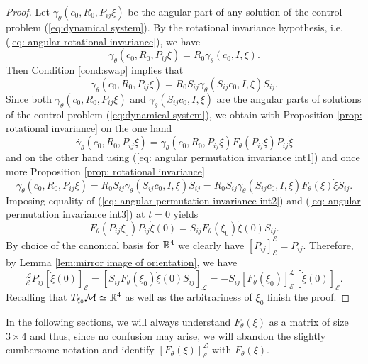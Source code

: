 \begin{proof}
Let $\gamma_\theta(c_0, R_0, P_{ij}\xi)$ be the angular part of any solution of the control problem (\ref{eq:dynamical system}). By the rotational invariance hypothesis, i.e. (\ref{eq: angular rotational invariance}), we have
\begin{equation}
	\gamma_\theta(c_0, R_0, P_{ij}\xi) = R_0 \gamma_\theta(c_0, I, \xi).
\end{equation}
Then Condition \ref{cond:swap} implies that
\begin{equation}
\label{eq: angular permutation invariance int1}
	\gamma_\theta(c_0, R_0,P_{ij} \xi) = R_0 S_{ij} \gamma_\theta(S_{ij}c_0, I, \xi) S_{ij}.
\end{equation}
Since both $\gamma_\theta(c_0, R_0, P_{ij} \xi)$ and $\gamma_\theta(S_{ij} c_0, I, \xi)$ are the angular parts of solutions of the control problem (\ref{eq:dynamical system}), we obtain with Proposition \ref{prop: rotational invariance} on the one hand
\begin{equation}
\label{eq: angular permutation invariance int2}
	\dot{\gamma_\theta}(c_0, R_0, P_{ij} \xi)= \gamma_\theta(c_0, R_0, P_{ij} \xi) F_{\theta}(P_{ij} \xi) P_{ij } \dot{\xi}
\end{equation}
and on the other hand using (\ref{eq: angular permutation invariance int1}) and once more Proposition \ref{prop: rotational invariance}
\begin{equation}
\label{eq: angular permutation invariance int3}
	\dot{\gamma_\theta}(c_0, R_0, P_{ij} \xi) =  R_0 S_{ij} \dot{\gamma_\theta}(S_{ij} c_0, I, \xi) S_{ij} = R_0 S_{ij} \gamma_\theta(S_{ij} c_0, I, \xi) F_{\theta}(\xi) \dot{\xi} S_{ij}.
\end{equation}
Imposing equality of (\ref{eq: angular permutation invariance int2}) and (\ref{eq: angular permutation invariance int3}) at $t = 0$ yields
\begin{equation}
	F_{\theta}(P_{ij} \xi_0) P_{ij}  \dot{\xi}(0) = S_{ij} F_{\theta}(\xi_0) \dot{\xi}(0) S_{ij}.
\end{equation}
By choice of the canonical basis for $\mathbb{R}^4$ we clearly have $[P_{ij}]_{\mathcal{E}}^{\mathcal{E}} = P_{ij}$. Therefore, by Lemma \ref{lem:mirror image of orientation}, we have
\begin{equation}
	[F_{\theta}(P_{ij} \xi_0)]_{\mathcal{E}}^{\mathcal{L}}  P_{ij} [\dot{\xi}(0)]_{\mathcal{E}} = [S_{ij} F_{\theta}(\xi_0) \dot{\xi}(0) S_{ij}]_{\mathcal{L}} = -S_{ij} [F_{\theta}(\xi_0)]_{\mathcal{E}}^{\mathcal{L}} [\dot{\xi}(0)]_{\mathcal{E}}.
\end{equation}
Recalling that $T_{\xi_0} \mathcal{M} \simeq \mathbb{R}^4$ as well as the arbitrariness of $\xi_0$ finish the proof.
\end{proof}

In the following sections, we will always understand $F_{\theta}(\xi)$ as a matrix of size $3 \times 4$ and thus, since no confusion may arise, we will abandon the slightly cumbersome notation and identify $[F_{\theta}(\xi)]_{\mathcal{E}}^{\mathcal{L}}$ with $F_{\theta}(\xi)$.





